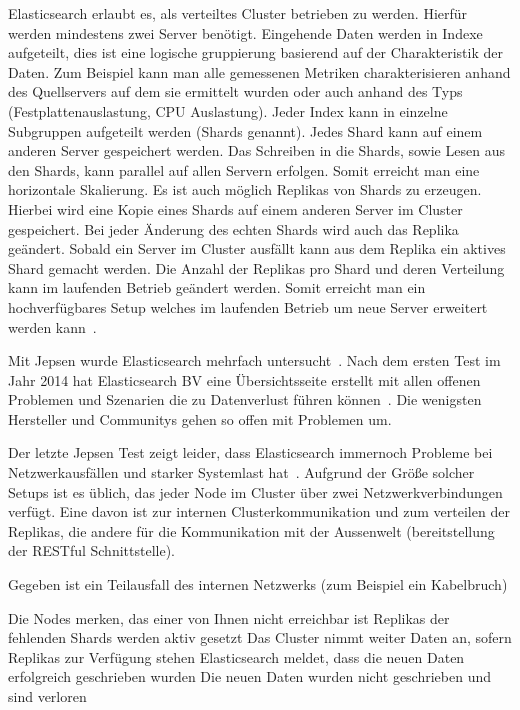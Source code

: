 Elasticsearch erlaubt es, als verteiltes Cluster betrieben zu werden. Hierfür
werden mindestens zwei Server benötigt. Eingehende Daten werden in Indexe
aufgeteilt, dies ist eine logische gruppierung basierend auf der Charakteristik
der Daten. Zum Beispiel kann man alle gemessenen Metriken charakterisieren
anhand des Quellservers auf dem sie ermittelt wurden oder auch anhand des Typs
(Festplattenauslastung, CPU Auslastung). Jeder Index kann in einzelne
Subgruppen aufgeteilt werden (Shards genannt). Jedes Shard kann auf einem
anderen Server gespeichert werden. Das Schreiben in die Shards, sowie Lesen aus
den Shards, kann parallel auf allen Servern erfolgen. Somit erreicht man eine
horizontale \gls{Skalierung}. Es ist auch möglich Replikas von Shards zu
erzeugen. Hierbei wird eine Kopie eines Shards auf einem anderen Server im
Cluster gespeichert. Bei jeder Änderung des echten Shards wird auch das Replika
geändert. Sobald ein Server im Cluster ausfällt kann aus dem Replika ein
aktives Shard gemacht werden. Die Anzahl der Replikas pro Shard und deren
Verteilung kann im laufenden Betrieb geändert werden. Somit erreicht man ein
hochverfügbares Setup welches im laufenden Betrieb um neue Server erweitert
werden kann~\cite{es_concepts}.

Mit \gls{Jepsen} wurde Elasticsearch mehrfach untersucht~\cite{es_jepsen_all}.
Nach dem ersten Test im Jahr 2014 hat Elasticsearch BV eine Übersichtsseite
erstellt mit allen offenen Problemen und Szenarien die zu Datenverlust führen
können~\cite{es_resiliency}. Die wenigsten Hersteller und Communitys gehen so
offen mit Problemen um.

Der letzte Jepsen Test zeigt leider, dass Elasticsearch immernoch Probleme bei
Netzwerkausfällen und starker Systemlast hat~\cite{jepsen_elastic}. Aufgrund
der Größe solcher Setups ist es üblich, das jeder Node im Cluster über zwei
Netzwerkverbindungen verfügt. Eine davon ist zur internen Clusterkommunikation
und zum verteilen der Replikas, die andere für die Kommunikation mit der
Aussenwelt (bereitstellung der RESTful Schnittstelle).

Gegeben ist ein Teilausfall des internen Netzwerks (zum Beispiel ein
Kabelbruch)

\begin{outline}
  \1 Die Nodes merken, das einer von Ihnen nicht erreichbar ist
  \1 Replikas der fehlenden Shards werden aktiv gesetzt
  \1 Das Cluster nimmt weiter Daten an, sofern Replikas zur Verfügung stehen
  \1 Elasticsearch meldet, dass die neuen Daten erfolgreich geschrieben wurden
  \1 Die neuen Daten wurden nicht geschrieben und sind verloren
\end{outline}

